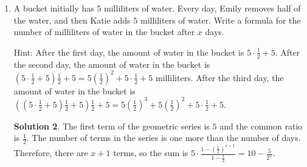 \documentclass{article}
\theoremstyle{definition}
\newtheorem*{solution}{Solution}
\begin{document}
\begin{enumerate}
        three years. The sum of the years in which the first six movies came out
        is $12057$. In what year will the seventh movie come out if the pattern
        continues?
        \begin{solution}
            Let's say that the first movie in the series came out in the year
            $Y$. Then the second movie came out in year $Y + 3$, the third in
            year $Y + 6$, and so on. The sum of the release years of the first
            six movies is $Y + (Y + 3) + (Y + 6) + (Y + 9) + (Y + 12) + (Y + 15)
            = 6Y + 45$. We are told this sum equals $12057$, so we can solve
            $6Y + 45 = 12057$ for $Y$. Doing so, we get $6Y = 12012$ and $Y =
            2002$. If the movie came out in $2002$, then the seventh movie is
            expected to come out in $2002 + 3 \cdot 6 = 2002 + 18 = 2020$.
        \end{solution}
        \item A bucket initially has $5$ milliliters of water. Every day, Emily
        removes half of the water, and then Katie adds $5$ milliliters of water.
        Write a formula for the number of milliliters of water in the bucket
        after $x$ days.

        Hint: After the first day, the amount of water in the
        bucket is $5 \cdot \frac{1}{2} + 5$. After the second day, the amount of
        water in the bucket is $\left(5 \cdot \frac{1}{2} + 5\right)\frac{1}{2}
        + 5 = 5\left(\frac{1}{2}\right)^2 + 5 \cdot \frac{1}{2} + 5$
        milliliters. After the third day, the amount of water in the bucket is
        $\left(\left(5 \cdot \frac{1}{2} + 5\right)\frac{1}{2} +
        5\right)\frac{1}{2} + 5 = 5\left(\frac{1}{2}\right)^3 +
        5\left(\frac{1}{2}\right)^2 + 5 \cdot \frac{1}{2} + 5$.
        \begin{solution}
            The first term of the geometric series is $5$ and the common ratio
            is $\frac{1}{2}$. The number of terms in the series is one more than
            the number of days. Therefore, there are $x + 1$ terms, so the sum
            is $5 \cdot \frac{1 - \left(\frac{1}{2}\right)^{x + 1}}{1 -
            \frac{1}{2}} = 10 - \frac{5}{2^x}$.
        \end{solution}
    \end{enumerate}
\end{document}
